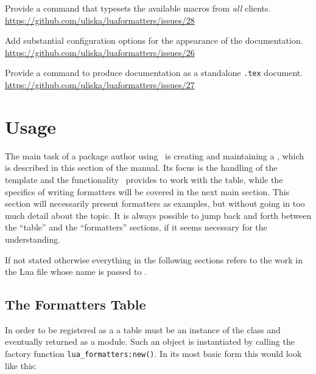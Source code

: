 \documentclass[12pt]{scrartcl}
\begin{document}
\begin{itemize*}
\item Provide a command that typesets the available macros from \emph{all} clients.\\
\url{https://github.com/uliska/luaformatters/issues/28}
\item Add substantial configuration options for the appearance of the documentation.\\
\url{https://github.com/uliska/luaformatters/issues/26}
\item Provide a command to produce documentation as a standalone \texttt{.tex} document.\\
\url{https://github.com/uliska/luaformatters/issues/27}
\end{itemize*}



\section{Usage}
\label{sec:usage}


The main task of a package author using \luaformatters\ is creating and
maintaining a , which is described in this section of the
manual.  Its focus is the handling of the template and the functionality
\luaformatters\ provides to work with the table, while the specifics of
writing formatters will be covered in the next main section.  This section will
necessarily present formatters as examples, but without going in too much detail
about the topic.  It is always possible to jump back and forth between the
“table” and the “formatters” sections, if it seems necessary for the
understanding.

If not stated otherwise everything in the following sections refers to the work
in the Lua file whose name is passed to \texttt{\addLuaFormatters{}}.

\subsection{The Formatters Table}
\label{sec:usage:templates-table}

In order to be registered as a  a table must be an instance of the
 class and eventually returned as a module.  Such an object is instantiated by calling the factory
function \texttt{lua_formatters:new()}.  In its most basic form this would look like this:
\end{document}
